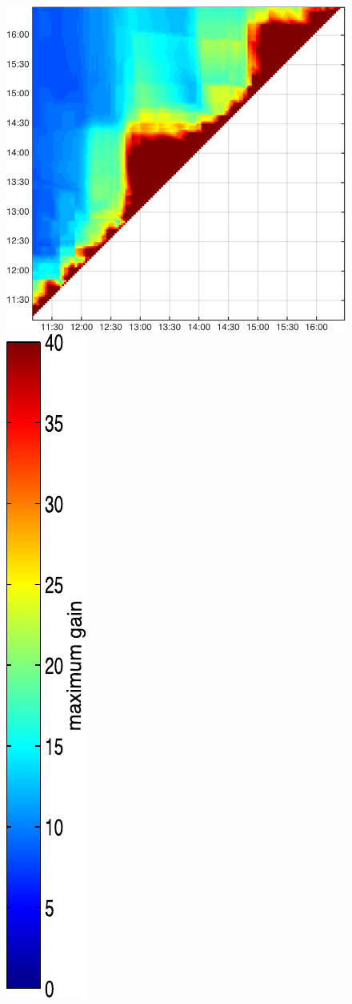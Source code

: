 \begin{figure}
\begin{minipage}[c]{\mylength}
\includegraphics[valign=t,width=\eventswidth]{events/20141020-maxGain-local-events.png}
\includegraphics[valign=t,trim=2pt -8pt 0 5pt,width=\colorbarwidth,totalheight=\eventheight]{events/colorbar-40.pdf}

\end{minipage}
\end{figure}
